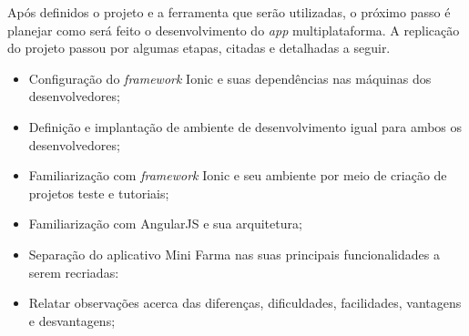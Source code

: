 Após definidos o projeto e a ferramenta que serão utilizadas, o próximo passo é planejar como será feito o desenvolvimento do \textit{app} multiplataforma. 
A replicação do projeto passou por algumas etapas, citadas e detalhadas a seguir.

\begin{itemize}
    \item Configuração do \textit{framework} Ionic e suas dependências nas máquinas dos desenvolvedores;
    \item Definição e implantação de ambiente de desenvolvimento igual para ambos os desenvolvedores;
    \item Familiarização com \textit{framework} Ionic e seu ambiente por meio de criação de projetos teste e tutoriais;
    \item Familiarização com AngularJS e sua arquitetura; 
    \item Separação do aplicativo Mini Farma nas suas principais funcionalidades a serem recriadas:
    \item Relatar observações acerca das diferenças, dificuldades, facilidades, vantagens e desvantagens;
\end{itemize}